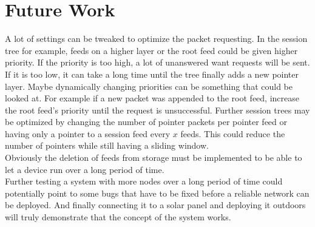 \section{Future Work}
A lot of settings can be tweaked to optimize the packet requesting. In the session tree for example, feeds on a higher layer or the root feed could be given higher priority. If the priority is too high, a lot of unanswered want requests will be sent. If it is too low, it can take a long time until the tree finally adds a new pointer layer. Maybe dynamically changing priorities can be something that could be looked at. For example if a new packet was appended to the root feed, increase the root feed's priority until the request is unsuccessful. Further session trees may be optimized by changing the number of pointer packets per pointer feed or having only a pointer to a session feed every $x$ feeds. This could reduce the number of pointers while still having a sliding window. \\
Obviously the deletion of feeds from storage must be implemented to be able to let a device run over a long period of time. \\
Further testing a system with more nodes over a long period of time could potentially point to some bugs that have to be fixed before a reliable network can be deployed. And finally connecting it to a solar panel and deploying it outdoors will truly demonstrate that the concept of the system works. \\